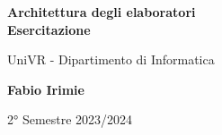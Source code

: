 \begin{titlepage}
	\begin{center}
		\vspace*{1cm}

		\Huge
		\textbf{Architettura degli elaboratori\\Esercitazione}

		\vspace{0.5cm}
		\LARGE
		UniVR - Dipartimento di Informatica

		\vspace{1.5cm}

		\textbf{Fabio Irimie}

		\vfill


		\vspace{0.8cm}


		2° Semestre 2023/2024

	\end{center}
\end{titlepage}
